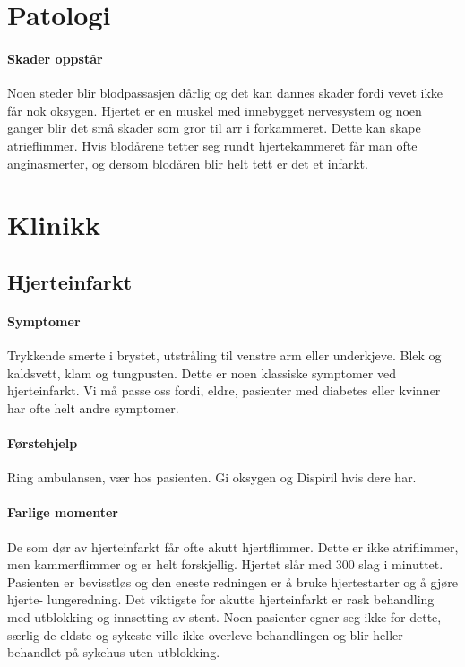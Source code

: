 		\section{Patologi}	
			\paragraph{Skader oppstår\\}
				Noen steder blir blodpassasjen dårlig og det kan dannes skader fordi vevet ikke får nok oksygen. Hjertet er en muskel med innebygget nervesystem og noen ganger blir det små skader som gror til arr i forkammeret. Dette kan skape atrieflimmer\cite{!!!}. Hvis blodårene tetter seg rundt hjertekammeret får man ofte anginasmerter, og dersom blodåren blir helt tett er det et infarkt.
		\section{Klinikk}
			\subsection{Hjerteinfarkt}	
				\paragraph{Symptomer\\}
					Trykkende smerte i brystet, utstråling til venstre arm eller underkjeve. Blek og kaldsvett, klam og tungpusten. Dette er noen klassiske symptomer ved hjerteinfarkt. Vi må passe oss fordi, eldre, pasienter med diabetes eller kvinner har ofte helt andre symptomer. 
				\paragraph{Førstehjelp\\}
					Ring ambulansen, vær hos pasienten. Gi oksygen og Dispiril hvis dere har. 
				\paragraph{Farlige momenter\\}
					De som dør av hjerteinfarkt får ofte akutt hjertflimmer. Dette er ikke atriflimmer, men kammerflimmer og er helt forskjellig. Hjertet slår med 300 slag i minuttet. Pasienten er bevisstløs og den eneste redningen er å bruke hjertestarter og å gjøre hjerte- lungeredning. Det viktigste for akutte hjerteinfarkt er rask behandling med utblokking og innsetting av stent. Noen pasienter egner seg ikke for dette, særlig de eldste og sykeste ville ikke overleve behandlingen og blir heller behandlet på sykehus uten utblokking. 

